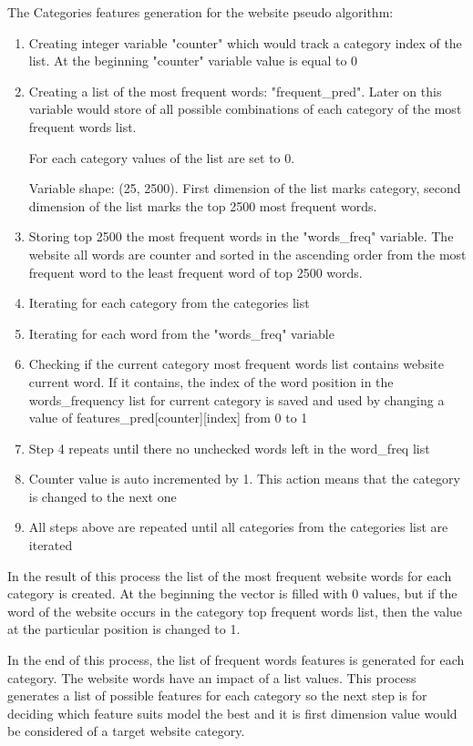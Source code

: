 The Categories features generation for the website pseudo algorithm:
\begin{enumerate}
    \item Creating integer variable "counter" which would track a category index of the list. At the beginning "counter" variable value is equal to 0
    \item Creating a list of the most frequent words: "frequent\_pred". Later on this variable would store of all possible combinations of each category of the most frequent words list.
    
    For each category values of the list are set to 0. 
    
    Variable shape: (25, 2500). First dimension of the list marks category, second dimension of the list marks the top 2500 most frequent words.
    
    \item Storing top 2500 the most frequent words in the "words\_freq" variable. The website all words are counter and sorted in the ascending order from the most frequent word to the least frequent word of top 2500 words. 
    \item Iterating for each category from the categories list
    \item Iterating for each word from the "words\_freq" variable
    \item Checking if the current category most frequent words list contains website current word. If it contains, the index of the word position in the words\_frequency list for current category is saved and used by changing a value of features\_pred[counter][index] from 0 to 1
    \item Step 4 repeats until there no unchecked words left in the word\_freq list
    \item Counter value is auto incremented by 1. This action means that the category is changed to the next one
    \item All steps above are repeated until all categories from the categories list are iterated
\end{enumerate}


In the result of this process the list of the most frequent website words for each category is created. At the beginning the vector is filled with 0 values, but if the word of the website occurs in the category top frequent words list, then the value at the particular position is changed to 1.


In the end of this process, the list of frequent words features is generated for each category. The website words have an impact of a list values. This process generates a list of possible features for each category so the next step is for deciding which feature suits model the best and it is first dimension value would be considered of a target website category.



